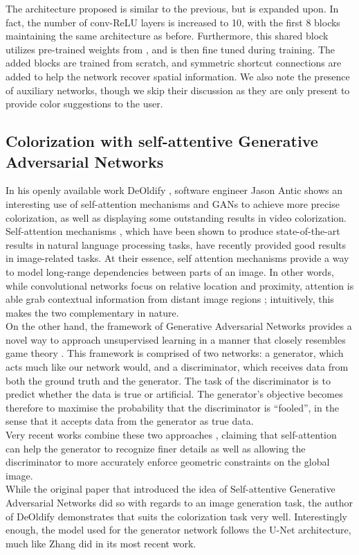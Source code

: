 \documentclass[twoside,twocolumn]{article}
\begin{document}
The architecture proposed is similar to the previous, but is expanded upon. In fact, the number of conv-ReLU layers is increased to 10, with the first 8 blocks maintaining the same architecture as before. Furthermore, this shared block utilizes pre-trained weights from \cite{Zhang:2016}, and is then fine tuned during training. The added blocks are trained from scratch, and symmetric shortcut connections are added to help the network recover spatial information.
We also note the presence of auxiliary networks, though we skip their discussion as they are only present to provide color suggestions to the user.


\subsection{Colorization with self-attentive Generative Adversarial Networks}

In his openly available work DeOldify \cite{Jason:github}, software engineer Jason Antic shows an interesting use of self-attention mechanisms and GANs to achieve more precise colorization, as well as displaying some outstanding results in video colorization.\\
Self-attention mechanisms \cite{Ashish:2017}, which have been shown to produce state-of-the-art results in natural language processing tasks, have recently provided good results in image-related tasks. At their essence, self attention mechanisms provide a way to model long-range dependencies between parts of an image. In other words, while convolutional networks focus on relative location and proximity, attention is able grab contextual information from distant image regions \cite{Chris:guide}; intuitively, this makes the two complementary in nature.\\
On the other hand, the framework of Generative Adversarial Networks provides a novel way  to approach unsupervised learning in a manner that closely resembles game theory \cite{Ian:2014}. This framework is comprised of two networks: a generator, which acts much like our network would, and a discriminator, which receives data from both the ground truth and the generator. The task of the discriminator is to predict whether the data is true or artificial. The generator’s objective becomes therefore to maximise the probability that the discriminator is “fooled”, in the sense that it accepts data from the generator as true data.\\
Very recent works combine these two approaches \cite{Han:2019}, claiming that self-attention can help the generator to recognize finer details as well as allowing the discriminator to more accurately enforce geometric constraints on the global image.\\
While the original paper that introduced the idea of Self-attentive Generative Adversarial Networks did so with regards to an image generation task, the author of DeOldify demonstrates that suits the colorization task very well. Interestingly enough, the model used for the generator network follows the U-Net architecture, much like Zhang \cite{Zhang:2017} did in its most recent work.
\end{document}
